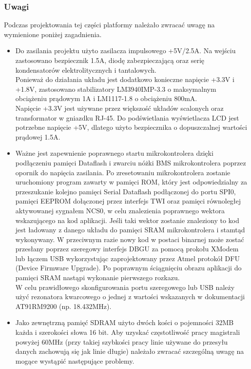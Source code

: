 \documentclass[a4paper,12pt]{book}
\begin{document}
				\subsubsection{Uwagi}
					\label{sec:uwagi}
					Podczas projektowania tej części platformy należało zwracać uwagę na wymienione poniżej zagadnienia.
					\begin{itemize}
						\item Do zasilania projektu użyto zasilacza impulsowego +5V/2.5A. Na wejściu zastosowano bezpiecznik 1.5A, diodę zabezpieczającą oraz serię kondensatorów elektrolitycznych i tantalowych.\\
						Ponieważ do działania układu jest dodatkowo konieczne napięcie +3.3V i +1.8V, zastosowano stabilizatory LM3940IMP-3.3 o maksymalnym obciążeniu prądowym 1A i LM1117-1.8 o obciążeniu 800mA.\\
						Napięcie +3.3V jest używane przez większość układów scalonych oraz transformator w gniazdku RJ-45. Do podświetlania wyświetlacza LCD jest potrzebne napięcie +5V, dlatego użyto bezpiecznika o dopuszczalnej wartości prądowej 1.5A.
						\item Ważne jest zapewnienie poprawnego startu mikrokontrolera dzięki podłączeniu pamięci Dataflash i zwarciu nóżki BMS mikrokontrolera poprzez opornik do napięcia zasilania. Po zresetowaniu mikrokontrolera zostanie uruchomiony program zawarty w pamięci ROM, który jest odpowiedzialny za przeszukanie kolejno pamięci Serial Dataflash podłączonej do portu SPI0, pamięci EEPROM dołączonej przez interfejs TWI oraz pamięci równoległej aktywowanej sygnałem NCS0, w celu znalezienia poprawnego wektora wskazującego na kod aplikacji. Jeśli taki wektor zostanie znaleziony to kod jest ładowany z danego układu do pamięci SRAM mikrokontrolera i stamtąd wykonywany. W przeciwnym razie nowy kod w postaci binarnej może zostać przesłany poprzez szeregowy interfejs DBGU za pomocą prokołu XModem lub łączem USB wykorzystując zaprojektowany przez Atmel protokół DFU (Device Firmware Upgrade). Po poprawnym ściągnięciu obrazu aplikacji do pamięci SRAM nastąpi wykonanie pierwszego rozkazu.\\
							W celu prawidłowego skonfigurowania portu szeregowego lub USB należy użyć rezonatora kwarcowego o jednej z wartości wskazanych w dokumentacji AT91RM9200 (np. 18.432MHz).
						\item Jako zewnętrzną pamięć SDRAM użyto dwóch kości o pojemności 32MB każda i szerokości słowa 16 bit. Aby uzyskać częstotliwość pracy magistrali powyżej 60MHz (przy takiej szybkości pracy linie używane do przesyłu danych zachowują się jak linie długie) należało zwracać szczególną uwagę na mogące wystąpić następujące problemy.

\end{itemize}
\end{document}
